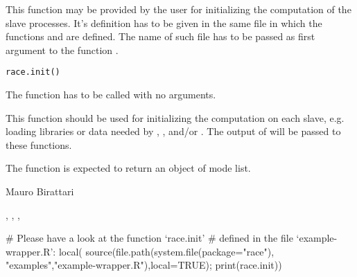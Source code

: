 \begin{Description}\relax
This function may be provided by the user for initializing
the computation of the slave processes. It's definition has to be given
in the same file in which the functions  and
 are defined.
The name of such file has to be passed as first argument to the
function .
\end{Description}
\begin{Usage}
\begin{verbatim}race.init()\end{verbatim}
\end{Usage}
\begin{Arguments}
The function  has to be called with no
arguments.
\end{Arguments}
\begin{Details}\relax
This function should be used for initializing the computation
on each slave, e.g. loading libraries or data needed by
, , and/or
. The output of
 will be passed to these functions.
\end{Details}
\begin{Value}
The function  is expected to return an object of
mode list.
\end{Value}
\begin{Author}\relax
Mauro Birattari
\end{Author}
\begin{SeeAlso}\relax
{}, ,
, 
\end{SeeAlso}
\begin{Examples}
\begin{ExampleCode}
# Please have a look at the function `race.init'
# defined in the file `example-wrapper.R':
local({
  source(file.path(system.file(package="race"),
                           "examples","example-wrapper.R"),local=TRUE);
  print(race.init)})
\end{ExampleCode}
\end{Examples}

